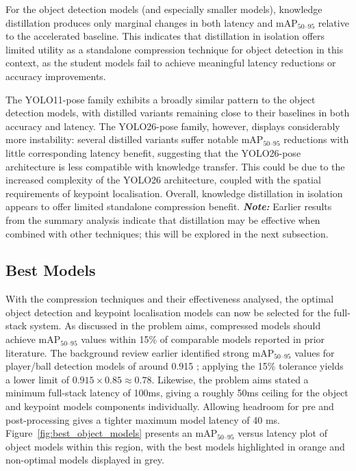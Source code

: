 For the object detection models (and especially smaller models), knowledge distillation produces only marginal changes in both latency and mAP$_{50\text{--}95}$ relative to the accelerated baseline. This indicates that distillation in isolation offers limited utility as a standalone compression technique for object detection in this context, as the student models fail to achieve meaningful latency reductions or accuracy improvements. 

The YOLO11-pose family exhibits a broadly similar pattern to the object detection models, with distilled variants remaining close to their baselines in both accuracy and latency. The YOLO26-pose family, however, displays considerably more instability: several distilled variants suffer notable mAP$_{50\text{--}95}$ reductions with little corresponding latency benefit, suggesting that the YOLO26-pose architecture is less compatible with knowledge transfer. This could be due to the increased complexity of the YOLO26 architecture, coupled with the spatial requirements of keypoint localisation. Overall, knowledge distillation in isolation appears to offer limited standalone compression benefit. \textit{\textbf{Note:}} Earlier results from the summary analysis indicate that distillation may be effective when combined with other techniques; this will be explored in the next subsection.

\subsection{Best Models}

With the compression techniques and their effectiveness analysed, the optimal object detection and keypoint localisation models can now be selected for the full-stack system. As discussed in the problem aims, compressed models should achieve mAP$_{50\text{--}95}$ values within 15\% of comparable models reported in prior literature. The background review earlier identified strong mAP$_{50\text{--}95}$ values for player/ball detection models of around 0.915 \cite{footandball}; applying the 15\% tolerance yields a lower limit of $0.915 \times 0.85 \approx 0.78$. Likewise, the problem aims stated a minimum full-stack latency of 100ms, giving a roughly 50ms ceiling for the object and keypoint models components individually. Allowing headroom for pre and post-processing gives a tighter maximum model latency of 40 ms. Figure~\ref{fig:best_object_models} presents an mAP$_{50\text{--}95}$ versus latency plot of object models within this region, with the best models highlighted in orange and non-optimal models displayed in grey.

